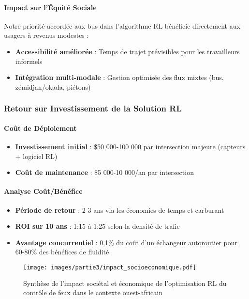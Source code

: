 \paragraph{Impact sur l'Équité Sociale}
Notre priorité accordée aux bus dans l'algorithme RL bénéficie directement aux usagers à revenus modestes :
\begin{itemize}
    \item \textbf{Accessibilité améliorée} : Temps de trajet prévisibles pour les travailleurs informels
    \item \textbf{Intégration multi-modale} : Gestion optimisée des flux mixtes (bus, zémidjan/okada, piétons)
\end{itemize}

\subsubsection{Retour sur Investissement de la Solution RL}

\paragraph{Coût de Déploiement}
\begin{itemize}
    \item \textbf{Investissement initial} : \$50 000-100 000 par intersection majeure (capteurs + logiciel RL)
    \item \textbf{Coût de maintenance} : \$5 000-10 000/an par intersection
\end{itemize}

\paragraph{Analyse Coût/Bénéfice}
\begin{itemize}
    \item \textbf{Période de retour} : 2-3 ans via les économies de temps et carburant
    \item \textbf{ROI sur 10 ans} : 1:15 à 1:25 selon la densité de trafic
    \item \textbf{Avantage concurrentiel} : 0,1\% du coût d'un échangeur autoroutier pour 60-80\% des bénéfices de fluidité
\end{itemize}

\begin{figure}[htbp]
    \centering
    \texttt{[image: images/partie3/impact\_socioeconomique.pdf]}
    \caption{Synthèse de l'impact sociétal et économique de l'optimisation RL du contrôle de feux dans le contexte ouest-africain}
    \label{fig:impact_socioeconomique}
\end{figure}

